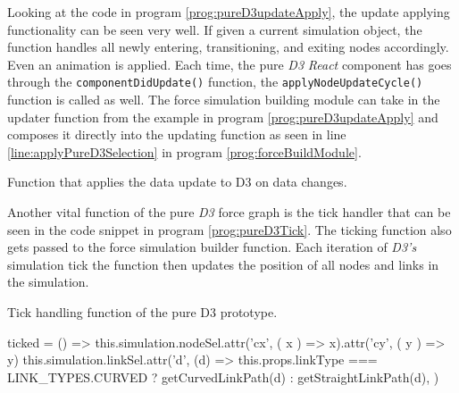 Looking at the code in program \ref{prog:pureD3updateApply}, the update applying functionality can be seen very well. If given a current simulation object, the function handles all newly entering, transitioning, and exiting nodes accordingly. Even an animation is applied. Each time, the pure \emph{D3} \emph{React} component has goes through the \texttt{componentDidUpdate()} function, the \texttt{applyNodeUpdateCycle()} function is called as well. The force simulation building module can take in the updater function from the example in program \ref{prog:pureD3updateApply} and composes it directly into the updating function as seen in line \ref{line:applyPureD3Selection} in program \ref{prog:forceBuildModule}.

\begin{program}[th]
\caption{Function that applies the data update to D3 on data changes.}
\label{prog:pureD3updateApply}
\end{program}

Another vital function of the pure \emph{D3} force graph is the tick handler that can be seen in the code snippet in program \ref{prog:pureD3Tick}. The ticking function also gets passed to the force simulation builder function. Each iteration of \emph{D3's} simulation tick the function then updates the position of all nodes and links in the simulation.

\begin{program}[th]
\caption{Tick handling function of the pure D3 prototype.}
\label{prog:pureD3Tick}
\begin{JsCode}
ticked = () => {
  this.simulation.nodeSel.attr('cx', ({ x }) => x).attr('cy', ({ y }) => y)
  this.simulation.linkSel.attr('d', (d) =>
    this.props.linkType === LINK_TYPES.CURVED ? getCurvedLinkPath(d) : getStraightLinkPath(d),
  )
}
\end{JsCode}
\end{program}

